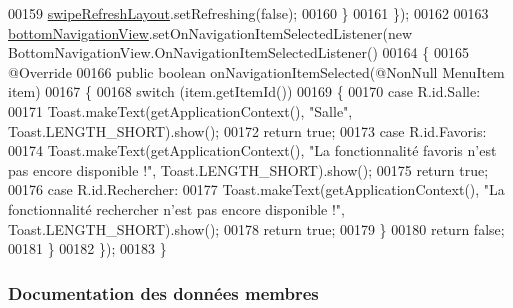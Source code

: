\begin{DoxyCode}
00159                 \hyperlink{classcom_1_1lasalle_1_1meeting_1_1_salle_activity_aa331ece163b959f06fae00a637d37cb4}{swipeRefreshLayout}.setRefreshing(\textcolor{keyword}{false});
00160             \}
00161         \});
00162 
00163         \hyperlink{classcom_1_1lasalle_1_1meeting_1_1_salle_activity_a43f122362683c363d7eee1b1f1dfd581}{bottomNavigationView}.setOnNavigationItemSelectedListener(\textcolor{keyword}{new} 
      BottomNavigationView.OnNavigationItemSelectedListener()
00164         \{
00165             @Override
00166             \textcolor{keyword}{public} \textcolor{keywordtype}{boolean} onNavigationItemSelected(@NonNull MenuItem item)
00167             \{
00168                 \textcolor{keywordflow}{switch} (item.getItemId())
00169                 \{
00170                     \textcolor{keywordflow}{case} R.id.Salle:
00171                         Toast.makeText(getApplicationContext(), \textcolor{stringliteral}{"Salle"}, Toast.LENGTH\_SHORT).show();
00172                         \textcolor{keywordflow}{return} \textcolor{keyword}{true};
00173                     \textcolor{keywordflow}{case} R.id.Favoris:
00174                         Toast.makeText(getApplicationContext(), \textcolor{stringliteral}{"La fonctionnalité favoris n'est pas encore
       disponible !"}, Toast.LENGTH\_SHORT).show();
00175                         \textcolor{keywordflow}{return} \textcolor{keyword}{true};
00176                     \textcolor{keywordflow}{case} R.id.Rechercher:
00177                         Toast.makeText(getApplicationContext(), \textcolor{stringliteral}{"La fonctionnalité rechercher n'est pas
       encore disponible !"}, Toast.LENGTH\_SHORT).show();
00178                         \textcolor{keywordflow}{return} \textcolor{keyword}{true};
00179                 \}
00180                 \textcolor{keywordflow}{return} \textcolor{keyword}{false};
00181             \}
00182         \});
00183     \}
\end{DoxyCode}


\subsubsection{Documentation des données membres}
\mbox{\label{classcom_1_1lasalle_1_1meeting_1_1_salle_activity_a43f122362683c363d7eee1b1f1dfd581}} 
